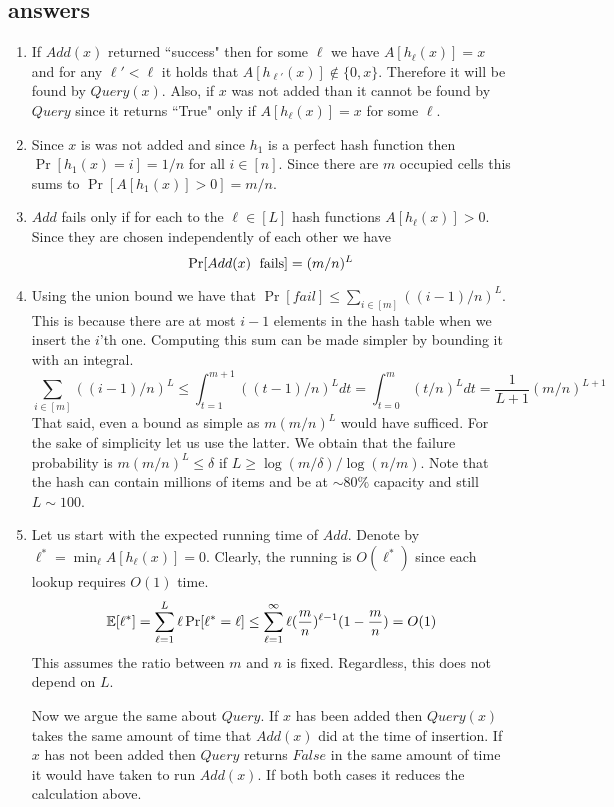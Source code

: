\documentclass{article}
\begin{document}
\subsection*{answers}
\begin{enumerate}
\item If $Add(x)$ returned ``success" then for some $\ell$ we have $A[h_\ell(x)] = x$ and for any $\ell' < \ell$ it holds that $A[h_{\ell'}(x)] \not\in \{0,x\}$. 
Therefore it will be found by $Query(x)$. Also, if $x$ was not added than it cannot be found by $Query$ since it returns ``True" only if $A[h_\ell(x)] = x$ for some $\ell$. 
\item Since $x$ is was not added and since $h_1$ is a perfect hash function then $\Pr[h_1(x) = i]  = 1/n$ for all $i \in [n]$.
Since there are $m$ occupied cells this sums to $\Pr[A[h_1(x)] > 0] = m/n$.
\item $Add$ fails only if for each to the $\ell \in [L]$ hash functions $A[h_\ell(x)] > 0$. Since they are chosen independently of each other we have 
\[
\Pr[Add(x) \mbox{\; fails}]=(m/n)^L
\]
\item Using the union bound we have that $\Pr[fail] \le \sum_{i \in [m]} ((i-1)/n)^L$. This is because there are at most $i-1$ elements in the hash table when we insert the $i$'th one. Computing this sum can be made simpler by bounding it with an integral.
\[
\sum_{i \in [m]} ((i-1)/n)^L \le \int_{t=1}^{m+1}((t-1)/n)^L dt = \int_{t=0}^{m}(t/n)^L dt = \frac{1}{L+1}(m/n)^{L+1}
\] 
That said, even a bound as simple as $m (m/n)^L$ would have sufficed. For the sake of simplicity let us use the latter.
We obtain that the failure probability is $m (m/n)^L \le \delta$ if $L \ge \log(m/\delta)/\log(n/m)$.
Note that the hash can contain millions of items and be at $\sim 80\%$ capacity and still $L \sim 100$.
\item Let us start with the expected running time of $Add$.  Denote by $\ell^{*} = \min_\ell A[h_\ell(x)] = 0$. 
Clearly, the running is $O(\ell^{*})$ since each lookup requires $O(1)$ time.
\[
{\mathbb E}[\ell^{*}] = \sum_{\ell=1}^{L} \ell  \Pr[\ell^{*} = \ell] \le  \sum_{\ell=1}^{\infty} \ell (\frac{m}{n})^{\ell-1}  (1- \frac{m}{n}) = O(1)
\]
This assumes the ratio between $m$ and $n$ is fixed. Regardless, this does not depend on $L$.

Now we argue the same about $Query$. If $x$ has been added then $Query(x)$ takes the same amount of time that $Add(x)$ did at the time of insertion.
If $x$ has not been added then $Query$ returns $False$ in the same amount of time it would have taken to run $Add(x)$.
If both both cases it reduces the calculation above.





\end{enumerate}
\end{document}
